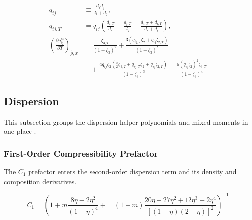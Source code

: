 \documentclass[12pt, letterpaper]{article}
\begin{document}
\begin{equation}
    \begin{aligned}
        q_{ij}&\equiv\frac{d_i d_j}{d_i+d_j},
        \\
        q_{ij,T}&=q_{ij}\left(
        \frac{d_{i,T}}{d_i}+\frac{d_{j,T}}{d_j}
        -\frac{d_{i,T}+d_{j,T}}{d_i+d_j}
        \right),
        \\
        \left(\frac{\partial g_{ij}^{\mathrm{hs}}}{\partial T}\right)_{\hat{\rho},x}
        &=\frac{\zeta_{3,T}}{\left(1-\zeta_{3}\right)^{2}}
        +\frac{3\left(q_{ij,T}\zeta_2+q_{ij}\zeta_{2,T}\right)}{\left(1-\zeta_3\right)^2}
        \\
        &\quad
        +\frac{4q_{ij}\zeta_2\left(\tfrac{3}{2}\zeta_{3,T}+q_{ij,T}\zeta_2+q_{ij}\zeta_{2,T}\right)}{\left(1-\zeta_3\right)^3}
        +\frac{6\left(q_{ij}\zeta_2\right)^2\zeta_{3,T}}{\left(1-\zeta_3\right)^4}
    \end{aligned}
    \label{eq:ghs_contact_dT}
\end{equation}

\subsection{Dispersion}
\label{sec:dispersion}

This subsection groups the dispersion helper polynomials and mixed moments in one place \cite{Gross2001}.

\subsubsection{First-Order Compressibility Prefactor}

The \(C_1\) prefactor enters the second-order dispersion term and its density and composition derivatives.

\begin{equation}
    C_{1} = \left(1+\bar{m} \frac{8 \eta-2 \eta^2}{(1-\eta)^4}+\right.\left.\quad(1-\bar{m}) \frac{20 \eta-27 \eta^2+12 \eta^3-2 \eta^4}{[(1-\eta)(2-\eta)]^2}\right)^{-1}
    \label{eq:c1_disp}
\end{equation}

\end{document}
